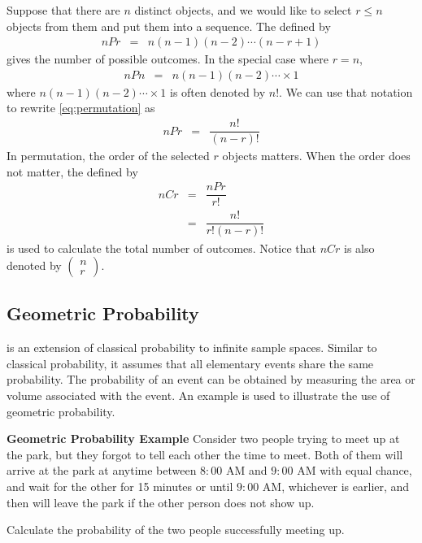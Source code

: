 Suppose that there are $n$ distinct objects, and we would like to select $r\leq n$ objects from them and put them into a sequence. The  defined by
\begin{eqnarray}
  nPr &=& n(n-1)(n-2)\cdots (n-r+1) \label{eq:permutation}
\end{eqnarray}
gives the number of possible outcomes. In the special case where $r=n$,
\begin{eqnarray}
  nPn &=& n(n-1)(n-2)\cdots \times 1 \nonumber
\end{eqnarray}
where $n(n-1)(n-2)\cdots \times 1$ is often denoted by $n!$. We can use that notation to rewrite \eqref{eq:permutation} as
\begin{eqnarray}
  nPr &=& \dfrac{n!}{(n-r)!} \nonumber
\end{eqnarray}
In permutation, the order of the selected $r$ objects matters. When the order does not matter, the  defined by
\begin{eqnarray}
  nCr &=& \dfrac{nPr}{r!} \nonumber \\
  &=& \dfrac{n!}{r!(n-r)!} \nonumber
\end{eqnarray}
is used to calculate the total number of outcomes. Notice that $nCr$ is also denoted by $\left(\begin{array}{c}
                                                                                           n \\
                                                                                           r
                                                                                         \end{array}\right)$.

\subsection{Geometric Probability}

 is an extension of classical probability to infinite sample spaces. Similar to classical probability, it assumes that all elementary events share the same probability. The probability of an event can be obtained by measuring the area or volume associated with the event. An example is used to illustrate the use of geometric probability.

\begin{mdframed}
\noindent \textbf{Geometric Probability Example}
Consider two people trying to meet up at the park, but they forgot to tell each other the time to meet. Both of them will arrive at the park at anytime between $8:00$ AM and $9:00$ AM with equal chance, and wait for the other for 15 minutes or until $9:00$ AM, whichever is earlier, and then will leave the park if the other person does not show up.

Calculate the probability of the two people successfully meeting up.

\end{mdframed}

